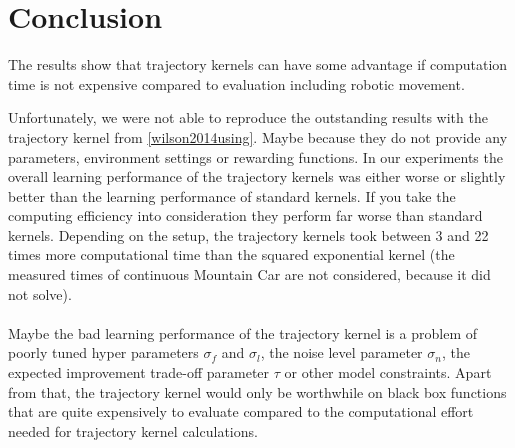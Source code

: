 \section{Conclusion}

The results show that trajectory kernels can have some advantage if computation time is not expensive compared to evaluation including robotic movement.

Unfortunately, we were not able to reproduce the outstanding results with the trajectory kernel from \ref{wilson2014using}. Maybe because they do not provide any parameters, environment settings or rewarding functions. In our experiments the overall learning performance of the trajectory kernels was either worse or slightly better than the learning performance of standard kernels. If you take the computing efficiency into consideration they perform far worse than standard kernels. Depending on the setup, the trajectory kernels took between 3 and 22 times more computational time than the squared exponential kernel (the measured times of continuous Mountain Car are not considered, because it did not solve).\\
\\
Maybe the bad learning performance of the trajectory kernel is a problem of poorly tuned hyper parameters $\sigma_f$ and $\sigma_l$, the noise level parameter $\sigma_n$, the expected improvement trade-off parameter $\tau$ or other model constraints. Apart from that, the trajectory kernel would only be worthwhile on black box functions that are quite expensively to evaluate compared to the computational effort needed for trajectory kernel calculations.
